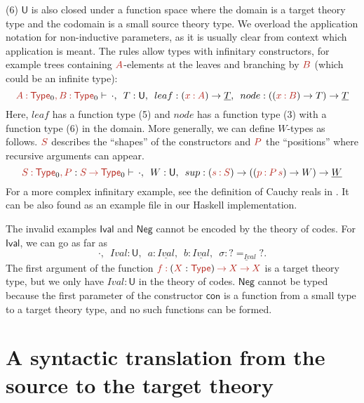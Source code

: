 \documentclass[a4paper,UKenglish]{lipics-v2018}
\newcommand{\U}{\mathsf{U}}
\newcommand{\ra}{\rightarrow}
\newcommand{\1}{\mathsf{1}} \renewcommand{\Pr}{\mathsf{Pr}}
\renewcommand{\in}{\mathbin{\hat:}}
\renewcommand{\hat}[1]{{\color{BrickRed}{#1}}}
\newcommand{\rah}{\mathbin{\hat\ra}}
\newcommand{\commah}{\hat,\,}
\newcommand{\Type}{\hat{\mathsf{Type}}}
\begin{document}
(6) $\U$ is also closed under a function space where the domain is a
target theory type and the codomain is a small source theory type. We
overload the application notation for non-inductive parameters, as it
is usually clear from context which application is meant. The rules
allow types with infinitary constructors, for example trees containing
$\hat{A}$-elements at the leaves and branching by $\hat{B}$ (which
could be an infinite type):
\[
\hat{A}\in\Type_0\commah\hat{B}\in\Type_0\vdash\,\cdot,\,\,\,T:\U,\,\,\,leaf:(\hat{x}\in \hat{A})\ra\underline{T},\,\,\,node:((\hat{x}\in \hat{B})\ra T)\ra\underline{T}
\]
Here, $leaf$ has a function type (5) and $node$ has a function type
(3) with a function type (6) in the domain. More generally, we can
define $W$-types \cite{abbot05containers} as follows. $\hat{S}$
describes the ``shapes'' of the constructors and $\hat{P}$ the
``positions'' where recursive arguments can appear.
\[
\hat{S}\in\Type_0\commah\hat{P}:\hat{S}\rah\Type_0\vdash\,\cdot,\,\,\,W:\U,\,\,\,sup: (\hat{s} \in \hat{S})\ra((\hat{p} \in \hat{P}\,\hat{s})\ra W)\ra \underline{W}
\]
For a more complex infinitary example, see the definition of Cauchy
reals in \cite[Definition 11.3.2]{HoTTbook}. It can be also found as
an example file in our Haskell implementation.

The invalid examples $\mathsf{Ival}$ and $\mathsf{Neg}$ cannot be
encoded by the theory of codes. For $\mathsf{Ival}$, we can go as far
as
\[
\cdot,\,\,\,{Ival}:\U,\,\,\,a:\underline{{Ival}},\,\,\,b:\underline{{Ival}},\,\,\,\sigma:\underline{?  =_{{Ival}} ?}.
\]
The first argument of the function
$\hat{f}\in(\hat{X}:\Type)\rah\hat{X}\rah\hat{X}$ is a target theory
type, but we only have ${Ival}:\U$ in the theory of
codes. $\mathsf{Neg}$ cannot be typed because the first parameter of
the constructor $\mathsf{con}$ is a function from a small type to a
target theory type, and no such functions can be formed.


\section{A syntactic translation from the source to the target theory}
\label{sec:translation}
\end{document}
